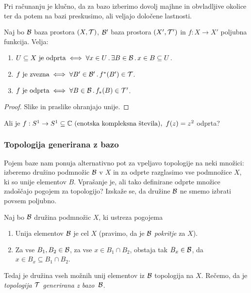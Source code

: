 Pri računanju je klučno, da za bazo izberimo dovolj majhne in obvladljive okolice ter da potem na bazi preskusimo, ali veljajo določene lastnosti.

\begin{trditev}
    Naj bo $\mathcal{B}$ baza prostora $(X, \mathcal{T})$, $\mathcal{B}'$ baza prostora $(X', \mathcal{T}')$ in $f: X \to X'$ poljubna funkcija. Velja:
    \begin{enumerate}
        \item $U \subseteq X \text{ je odprta} \iff \forall x \in U \,.\, \exists B \in \mathcal{B} \,.\, x \in B \subseteq U$.
        \item $f \text{ je zvezna} \iff \forall B' \in \mathcal{B}' \,.\, f^{*}(B') \in \mathcal{T}$.
        \item $f \text{ je odprta} \iff \forall B \in \mathcal{B} \,.\, f_{*}(B) \in \mathcal{T}'$.
    \end{enumerate}
\end{trditev}

\begin{proof}
    Slike in praslike ohranjajo unije.
\end{proof}

\begin{primer}
    Ali je $f: S^1 \to S^1 \subseteq \mathbb{C} \text{ (enotska kompleksna števila)}, \ f(z) = z^2$ odprta?
\end{primer}

\subsubsection{Topologija generirana z bazo}

Pojem baze nam ponuja alternativno pot za vpeljavo topologije na neki množici: izberemo družino podmnožic $\mathcal{B}$ v $X$ in za odprte razglasimo vse podmnožice $X$, ki so unije elementov $B$. Vprašanje je, ali tako definirane odprte množice zadoščajo pogojem za topologijo? Izskaže se, da družine $\mathcal{B}$ ne smemo izbrati povsem poljubno.

\begin{trditev}
    \label{trd:baza}
    Naj bo $\mathcal{B}$ družina podmnožic $X$, ki ustreza pogojema
    \begin{enumerate}
        \item Unija elementov $\mathcal{B}$ je cel $X$ (pravimo, da je $\mathcal{B}$ \emph{pokritje} za $X$).
        \item Za vse $B_1, B_2 \in \mathcal{B}$, za vse $x \in B_1 \cap B_2$, obstaja tak $B_x \in \mathcal{B}$, da $x \in B_x \subseteq B_1 \cap B_2$.
    \end{enumerate} 
    Tedaj je družina vseh možnih unij elementov iz $\mathcal{B}$ topologija na $X$.     
    Rečemo, da je \emph{topologija $\mathcal{T}$ generirana z bazo~$\mathcal{B}$}.
\end{trditev}


